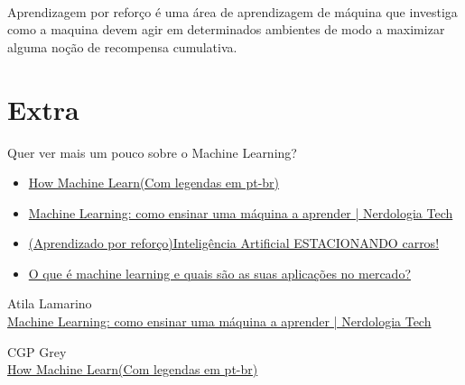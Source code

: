\documentclass[12pt]{article}
\begin{document}
    \paragraph{}Aprendizagem por reforço é uma área de aprendizagem de máquina que investiga como a maquina devem agir em determinados 
            ambientes de modo a maximizar alguma noção de recompensa cumulativa.

    \section*{Extra}
    Quer ver mais um pouco sobre o Machine Learning?
    \begin{itemize}
        \item\href{https://www.youtube.com/watch?v=R9OHn5ZF4Uo&t}{How Machine Learn(Com legendas em pt-br)}
        \item\href{https://www.youtube.com/watch?v=mhe5e2B9bL8&t}{Machine Learning: como ensinar uma máquina a aprender | Nerdologia Tech}
        \item\href{https://www.youtube.com/watch?v=r8KWciNmEGw}{(Aprendizado por reforço)Inteligência Artificial ESTACIONANDO carros!} 
        \item\href{https://blog.wittel.com/o-que-e-machine-learning/}{O que é machine learning e quais são as suas aplicações no mercado?}
    \end{itemize}

    \clearpage
    \begin{thebibliography}{2}
    
    Atila Lamarino \\
    \href{https://www.youtube.com/watch?v=mhe5e2B9bL8&t}{Machine Learning: como ensinar uma máquina a aprender | Nerdologia Tech}

    CGP Grey \\
    \href{https://www.youtube.com/watch?v=R9OHn5ZF4Uo&t}{How Machine Learn(Com legendas em pt-br)}

    \end{thebibliography}    
\end{document}
